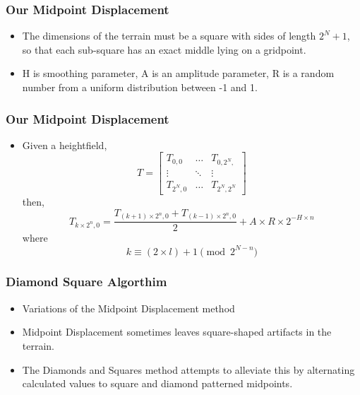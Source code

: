 \documentclass{beamer}
\begin{document}
\begin{frame}
\frametitle{Our Midpoint Displacement}
\begin{itemize}
 \item The dimensions of the terrain must be a square with sides of length $2^{N}+1$, so that each sub-square has an exact middle lying on a gridpoint.
\item H is smoothing parameter, A is an amplitude parameter, R is a random number from a uniform distribution between -1 and 1.
\end{itemize}
\end{frame}

\begin{frame}
\frametitle{Our Midpoint Displacement}
\begin{itemize}
 \item Given a heightfield,
		\begin{equation}
		T = \left[ \begin{matrix}
		T_{0,0} & \ldots & T_{0,2^{N},} \\
		\vdots  &  \ddots & \vdots \\
		T_{2^{N},0} & \ldots & T_{2^{N},2^{N}}
		\end{matrix} \right]
		\end{equation}
then,
		\begin{equation}
			T_{k \times 2^{n},0} = \frac{T_{(k+1) \times 2^{n},0} + T_{(k-1) \times 2^{n},0}}{2} + A \times R \times 2^{-H \times n}
		\end{equation}
where
		\begin{equation}
			k \equiv (2 \times l)+1 \pmod{2^{N-n}}
		\end{equation}

\end{itemize}
\end{frame}


\begin{frame}
 \frametitle{Diamond Square Algorthim}
\begin{itemize}
\item Variations of the Midpoint Displacement method
\item Midpoint Displacement sometimes leaves square-shaped artifacts in the terrain. 
\item The Diamonds and Squares method attempts to alleviate this by alternating calculated values to square and diamond patterned midpoints. 
\end{itemize}
\end{frame}
\end{document}
